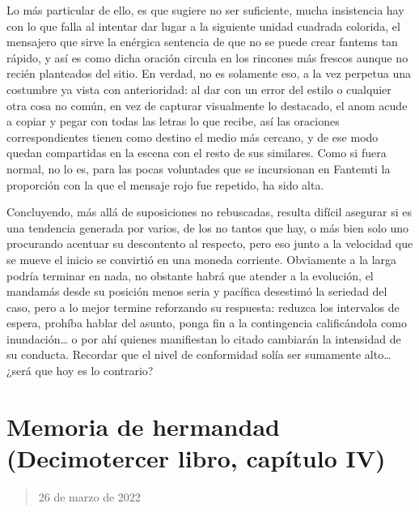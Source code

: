 \documentclass[
]{book}
\begin{document}
Lo más particular de ello, es que sugiere no ser suficiente, mucha insistencia hay con lo que falla al intentar dar lugar a la siguiente unidad cuadrada colorida, el mensajero que sirve la enérgica sentencia de que no se puede crear fantems tan rápido, y así es como dicha oración circula en los rincones más frescos aunque no recién planteados del sitio. En verdad, no es solamente eso, a la vez perpetua una costumbre ya vista con anterioridad: al dar con un error del estilo o cualquier otra cosa no común, en vez de capturar visualmente lo destacado, el anom acude a copiar y pegar con todas las letras lo que recibe, así las oraciones correspondientes tienen como destino el medio más cercano, y de ese modo quedan compartidas en la escena con el resto de sus similares. Como si fuera normal, no lo es, para las pocas voluntades que se incursionan en Fantemti la proporción con la que el mensaje rojo fue repetido, ha sido alta.

Concluyendo, más allá de suposiciones no rebuscadas, resulta difícil asegurar si es una tendencia generada por varios, de los no tantos que hay, o más bien solo uno procurando acentuar su descontento al respecto, pero eso junto a la velocidad que se mueve el inicio se convirtió en una moneda corriente. Obviamente a la larga podría terminar en nada, no obstante habrá que atender a la evolución, el mandamás desde su posición menos seria y pacífica desestimó la seriedad del caso, pero a lo mejor termine reforzando su respuesta: reduzca los intervalos de espera, prohíba hablar del asunto, ponga fin a la contingencia calificándola como inundación\ldots{} o por ahí quienes manifiestan lo citado cambiarán la intensidad de su conducta. Recordar que el nivel de conformidad solía ser sumamente alto\ldots{} ¿será que hoy es lo contrario?

\hypertarget{memoria-de-hermandad-decimotercer-libro-capuxedtulo-iv}{%
\section{Memoria de hermandad (Decimotercer libro, capítulo IV)}\label{memoria-de-hermandad-decimotercer-libro-capuxedtulo-iv}}

\begin{quote}
26 de marzo de 2022
\end{quote}
\end{document}
